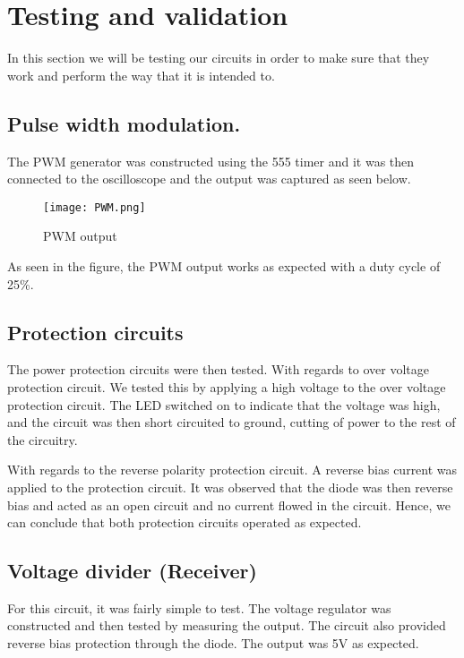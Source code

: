 \documentclass[class=report,11pt,crop=false]{standalone}
\begin{document}
\section{Testing and validation}

In this section we will be testing our circuits in order to make sure that they work and perform the way that it is intended to.

\subsection{Pulse width modulation.}

The PWM generator was constructed using the 555 timer and it was then connected to the oscilloscope and the output was captured as seen below.
\begin{figure}
    \centering
    \texttt{[image: PWM.png]}
    \caption{PWM output}
    \label{fig:enter-label6}
\end{figure}

As seen in the figure, the PWM output works as expected with a duty cycle of 25\%.

\subsection{Protection circuits}

The power protection circuits were then tested. With regards to over voltage protection circuit. We tested this by applying a high voltage to the over voltage protection circuit. The LED switched on to indicate that the voltage was high, and the circuit was then short circuited to ground, cutting of power to the rest of the circuitry.

With regards to the reverse polarity protection circuit. A reverse bias current was applied to the protection circuit. It was observed that the diode was then reverse bias and acted as an open circuit and no current flowed in the circuit. Hence, we can conclude that both protection circuits operated as expected.

\subsection{Voltage divider (Receiver)}

For this circuit, it was fairly simple to test. The voltage regulator was constructed and then tested by measuring the output. The circuit also provided reverse bias protection through the diode. The output was 5V as expected.
\end{document}
